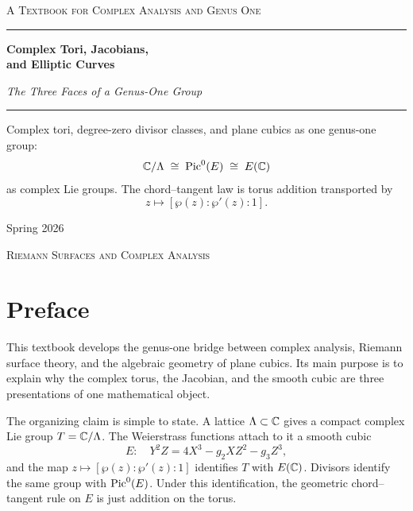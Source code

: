 \documentclass[11pt]{book}
\begin{document}
\frontmatter
\raggedbottom
\begin{titlepage}
\thispagestyle{empty}
\centering
\vspace*{0.08\textheight}

{\large\scshape A Textbook for Complex Analysis and Genus One\par}

\vspace{1.25cm}
\rule{0.74\textwidth}{0.45pt}\par
\vspace{0.85cm}

{\Huge\bfseries Complex Tori, Jacobians,\\[0.25em]
and Elliptic Curves\par}

\vspace{0.55cm}
{\Large\itshape The Three Faces of a Genus-One Group\par}

\vspace{0.85cm}
\rule{0.74\textwidth}{0.45pt}\par

\vspace{1.35cm}
\begin{minipage}{0.74\textwidth}
\centering
Complex tori, degree-zero divisor classes, and plane cubics as one genus-one
group:
\[
  \mathbb{C}/\Lambda\;\cong\;\operatorname{Pic}^0(E)\;\cong\;E(\mathbb{C})
\]
as complex Lie groups.  The chord--tangent law is torus addition transported by
\[
  z\longmapsto[\wp(z):\wp'(z):1].
\]
\end{minipage}

\vfill
{\large Spring 2026\par}
\vspace{0.45cm}
{\small\scshape Riemann Surfaces and Complex Analysis\par}
\end{titlepage}

\chapter*{Preface}

This textbook develops the genus-one bridge between complex analysis, Riemann
surface theory, and the algebraic geometry of plane cubics.  Its main purpose is
to explain why the complex torus, the Jacobian, and the smooth cubic are three
presentations of one mathematical object.

The organizing claim is simple to state.  A lattice \(\Lambda\subset\mathbb{C}\) gives a
compact complex Lie group \(T=\mathbb{C}/\Lambda\).  The Weierstrass functions attach to
it a smooth cubic
\[
  E:\quad Y^2Z=4X^3-g_2XZ^2-g_3Z^3,
\]
and the map \(z\mapsto[\wp(z):\wp'(z):1]\) identifies \(T\) with \(E(\mathbb{C})\).
Divisors identify the same group with \(\operatorname{Pic}^0(E)\).  Under this identification,
the geometric chord--tangent rule on \(E\) is just addition on the torus.
\end{document}
